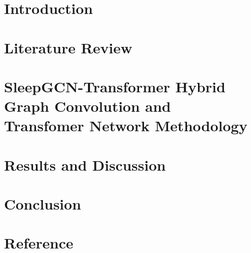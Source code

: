 \documentclass[12pt,a4paper]{report}
\begin{document}
	\pagestyle{plain}\clearpage
        \thispagestyle{empty}
	

         \pagestyle{plain}\clearpage
        \thispagestyle{empty}
	
      



        
	\thispagestyle{empty}
	
	\clearpage\thispagestyle{empty}

\clearpage\thispagestyle{empty}
	
	\thispagestyle{empty}
 
	
	\thispagestyle{empty}
	
        	\tableofcontents
	\listoffigures
	\listoftables
 
    
	\cleardoublepage{}
	\pagestyle{fancy}

	\chapter[Introduction]{Introduction}
	\label{chapter1}
	
	
	\chapter[Literature Review]{Literature Review}
	\label{chapter2}
	
	
	\chapter[SleepGCN-Transformer Hybrid Graph Convolution and Transfomer Network Methodology]{SleepGCN-Transformer Hybrid Graph Convolution and Transfomer Network Methodology}
	\label{chapter3}
	

        
 	\chapter[Results and Discussion]
    {Results and Discussion}

	
	\chapter[Conclusion]{Conclusion}
	\pagestyle{plain}
 

\chapter [Reference] {Reference}
		\pagestyle{plain}
	 




 
        \clearpage\thispagestyle{empty}
\end{document}
